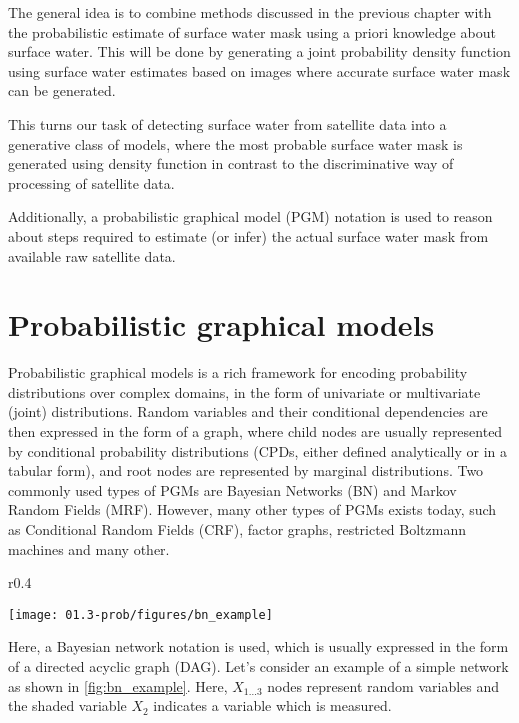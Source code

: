 The general idea is to combine methods discussed in the previous chapter with the probabilistic estimate of surface water mask using a priori knowledge about surface water. This will be done by generating a joint probability density function using surface water estimates based on images where accurate surface water mask can be generated. 

This turns our task of detecting surface water from satellite data into a generative class of models, where the most probable surface water mask is generated using density function in contrast to the discriminative way of processing of satellite data. 

Additionally, a probabilistic graphical model (PGM) notation is used to reason about steps required to estimate (or infer) the actual surface water mask from available raw satellite data.

\section{Probabilistic graphical models}

Probabilistic graphical models \cite{koller2009probabilistic} is a rich framework for encoding probability distributions over complex domains, in the form of univariate or multivariate (joint) distributions. Random variables and their conditional dependencies are then expressed in the form of a graph, where child nodes are usually represented by conditional probability distributions (CPDs, either defined analytically or in a tabular form), and root nodes are represented by marginal distributions. Two commonly used types of PGMs are Bayesian Networks (BN) and Markov Random Fields (MRF). However, many other types of PGMs exists today, such as Conditional Random Fields (CRF), factor graphs, restricted Boltzmann machines and many other.

\begin{wrapfigure}{r}{0.4\textwidth}
	\begin{center}
		\texttt{[image: 01.3-prob/figures/bn\_example]} 
	\end{center}
	\caption{A simple Bayesian network.}
	\label{fig:bn_example}
\end{wrapfigure}

Here, a Bayesian network notation is used, which is usually expressed in the form of a directed acyclic graph (DAG). Let's consider an example of a simple network as shown in \ref{fig:bn_example}. Here, $X_{1...3}$ nodes represent random variables and the shaded variable $X_2$ indicates a variable which is measured. 

